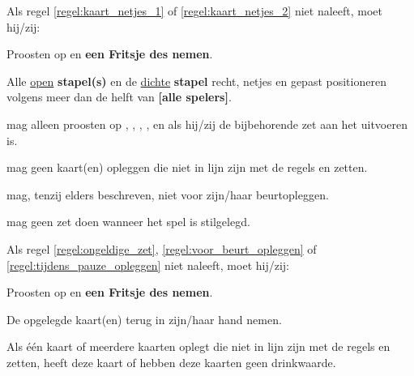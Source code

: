 \vervolgLijst{}
    \item Als \eenSpeler regel \ref{regel:kaart_netjes_1} of \ref{regel:kaart_netjes_2} niet naleeft, moet hij/zij:
    \puntLijst{}
        \item Proosten op  en \textbf{een Fritsje des nemen}\footnotemark[1].
        \item Alle \ul{open} \textbf{stapel(s)} en de \ul{dichte} \textbf{stapel} recht, netjes en gepast positioneren volgens meer dan de helft van \textbf{[alle spelers]}. 
    \eindPuntLijst{}
\eindLijst{}


\vervolgLijst{}
    \item \EenSpeler mag alleen proosten op , , , ,  en  als hij/zij de bijbehorende zet aan het uitvoeren is\footnotemark[2]. 
\eindLijst{}


\vervolgLijst{}
    \item \EenSpeler mag geen kaart(en) opleggen die niet in lijn zijn met de regels en zetten.
    \label{regel:ongeldige_zet}
\eindLijst{}

\vervolgLijst{}
    \item \EenSpeler mag, tenzij elders beschreven, niet voor zijn/haar beurt\footnotemark[3] opleggen.
    \label{regel:voor_beurt_opleggen}
\eindLijst{}

\vervolgLijst{}
    \item \EenSpeler mag geen zet doen wanneer het spel is stilgelegd.
    \label{regel:tijdens_pauze_opleggen}
\eindLijst{}

\vervolgLijst{}
    \item Als \eenSpeler regel \ref{regel:ongeldige_zet}, \ref{regel:voor_beurt_opleggen} of \ref{regel:tijdens_pauze_opleggen} niet naleeft, moet hij/zij:
    \puntLijst{}
        \item Proosten op  en \textbf{een Fritsje des nemen}\footnotemark[1].
        \item De opgelegde kaart(en) terug in zijn/haar hand nemen.
    \eindPuntLijst{}
    \label{regel:kaarten_terugnemen_2}
\eindLijst{}

\vervolgLijst{}
    \item Als \eenSpeler één kaart of meerdere kaarten oplegt die niet in lijn zijn met de regels en zetten, heeft deze kaart of hebben deze kaarten geen drinkwaarde.
\eindLijst{}  

